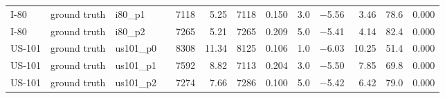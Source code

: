 \begin{table}[htbp]
{\begin{tabular}{lllrrrrrrrrrr}
I-80 & ground truth & i80\_p1 &  & 7118 & 5.25 & 7118 & 0.150 & 3.0 & $-$5.56 & 3.46 & 78.6 & 0.000 \\
I-80 & ground truth & i80\_p2 &  & 7265 & 5.21 & 7265 & 0.209 & 5.0 & $-$5.41 & 4.14 & 82.4 & 0.000 \\
US-101 & ground truth & us101\_p0 &  & 8308 & 11.34 & 8125 & 0.106 & 1.0 & $-$6.03 & 10.25 & 51.4 & 0.000 \\
US-101 & ground truth & us101\_p1 &  & 7592 & 8.82 & 7113 & 0.204 & 3.0 & $-$5.50 & 7.85 & 69.8 & 0.000 \\
US-101 & ground truth & us101\_p2 &  & 7274 & 7.66 & 7286 & 0.100 & 5.0 & $-$5.42 & 6.42 & 79.0 & 0.000 \\
\bottomrule
\end{tabular}
}
\end{table}
